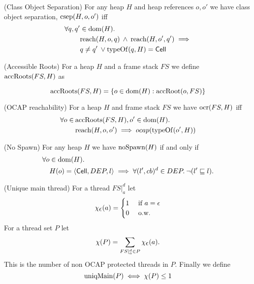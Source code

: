 \begin{definition}{(Class Object Separation)}
  For any heap $H$ and heap references $o, o'$ we have class object separation,
  $\mbox{$\mathrm{csep}$}{(H, o, o')}$ iff
  \begin{align}
    \label{eq:csep_def}
    \forall q, q' &\in \mbox{$\mathrm{dom}$}{(H)}. \notag\\
    & \mbox{$\mathrm{reach}$}{(H, o, q)} \: \land \: \mbox{$\mathrm{reach}$}{(H, o', q')} \implies \notag\\ 
    &q \neq q' \: \lor \mbox{$\mathrm{typeOf}$}{(q, H)} = \mbox{$\mathsf{Cell}$}
  \end{align}
\end{definition}

\begin{definition}{(Accessible Roots)}
  For a heap $H$ and a frame stack $FS$ we define $\mbox{$\mathrm{accRoots}$}{(FS, H)}$ as

  \begin{equation}
    \mbox{$\mathrm{accRoots}$}{(FS, H)} = \left\{ o \in \mbox{$\mathrm{dom}$}{(H)}: \mbox{$\mathrm{accRoot}$}{(o, FS)} \right\}
  \end{equation}
\end{definition}

\begin{definition}{(OCAP reachability)}
  For a heap $H$ and frame stack $FS$ we have $\mbox{$\mathrm{ocr}$}{(FS,H)}$ iff
  \begin{align}
    \label{eq:ocr_def}
    \forall o \in \: &\mbox{$\mathrm{accRoots}$}(FS,H), o' \in \mbox{$\mathrm{dom}$}(H). \notag\\
    &\mbox{$\mathrm{reach}$}{(H, o, o')} \implies \mbox{$ocap$}{(\mbox{$\mathrm{typeOf}$}{(o', H)})}
  \end{align}
\end{definition}

\begin{definition}{(No Spawn)}
  For any heap $H$ we have $\mbox{$\mathrm{noSpawn}$}(H)$ if and only if
  \begin{equation}
    \begin{aligned}
      \forall o &\in \mbox{$\mathrm{dom}$}(H). \\
        & H(o) = \mbox{$\langle \mbox{$\mathsf{Cell}$}{}, DEP, l \rangle$} \implies 
        \forall (l', cb)^d \in DEP. \: \lnot (l' \sqsubseteq l).
    \end{aligned}
  \end{equation}
\end{definition}

\begin{definition}{(Unique main thread)}
  For a thread $FS|_a^d$ let
  \begin{equation*}
    \chi_{\mbox{$\epsilon$}}(a) =
    \begin{cases}
      1 & \text{ if } a = \mbox{$\epsilon$} \\
      0 & \text{ o.w. }
    \end{cases}
  \end{equation*}
  For a thread set $P$ let
  \begin{equation*}
    \chi(P) = \sum_{FS|_a^d \in P} \chi_{\mbox{$\epsilon$}}(a).
  \end{equation*}
  This is the number of non OCAP protected threads in $P$. Finally we define
  \begin{equation*}
    \mbox{$\mathrm{uniqMain}$}(P) \iff \chi(P) \leq 1
  \end{equation*}
\end{definition}

